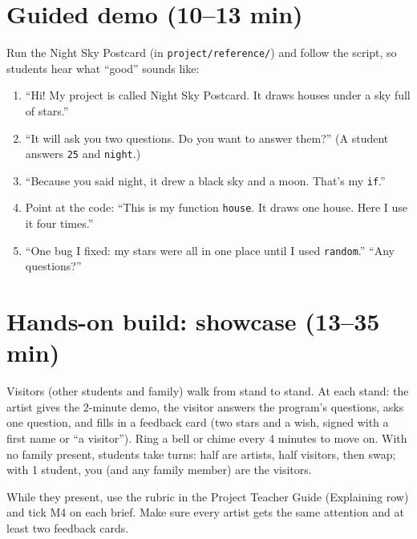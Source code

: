 \section{Guided demo (10--13 min)}
\begin{workedexample}
Run the Night Sky Postcard (in \texttt{project/reference/}) and follow the script, so students hear what \enquote{good} sounds like:
\begin{enumerate}[leftmargin=1.4em,itemsep=1pt]
  \item \enquote{Hi! My project is called Night Sky Postcard. It draws houses under a sky full of stars.}
  \item \enquote{It will ask you two questions. Do you want to answer them?} (A student answers \texttt{25} and \texttt{night}.)
  \item \enquote{Because you said night, it drew a black sky and a moon. That's my \texttt{if}.}
  \item Point at the code: \enquote{This is my function \texttt{house}. It draws one house. Here I use it four times.}
  \item \enquote{One bug I fixed: my stars were all in one place until I used \texttt{random}.} \enquote{Any questions?}
\end{enumerate}
\end{workedexample}

\section{Hands-on build: showcase (13--35 min)}
\begin{unplugged}
Visitors (other students and family) walk from stand to stand. At each stand: the artist gives the 2-minute demo, the visitor answers the program's questions, asks one question, and fills in a feedback card (two stars and a wish, signed with a first name or \enquote{a visitor}). Ring a bell or chime every 4 minutes to move on. With no family present, students take turns: half are artists, half visitors, then swap; with 1 student, you (and any family member) are the visitors.
\end{unplugged}
While they present, use the rubric in the Project Teacher Guide (Explaining row) and tick M4 on each brief. Make sure every artist gets the same attention and at least two feedback cards.

